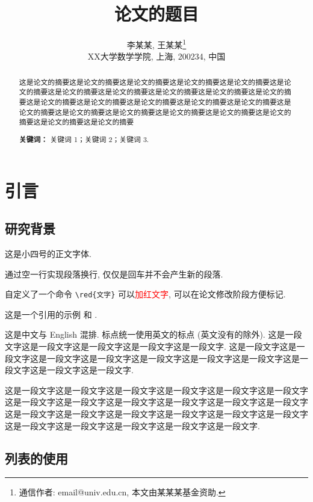 \documentclass[zihao=-4,twoside,final]{ctexart}
\title{论文的题目}
\author{李某某, 王某某\thanks{通信作者: email@univ.edu.cn, 本文由某某某基金资助.} \\[6pt]
  XX大学数学学院, 上海, 200234, 中国}
\date{}
\numberwithin{equation}{section}
\numberwithin{figure}{section}
\numberwithin{table}{section}
\theoremstyle{plain}
\newcommand{\red}[1]{\textcolor{red}{#1}}
\begin{document}
\maketitle

\begin{abstract}
这是论文的摘要这是论文的摘要这是论文的摘要这是论文的摘要这是论文的摘要这是论文的摘要这是论文的摘要这是论文的摘要这是论文的摘要这是论文的摘要这是论文的摘要这是论文的摘要这是论文的摘要这是论文的摘要这是论文的摘要这是论文的摘要这是论文的摘要这是论文的摘要这是论文的摘要这是论文的摘要这是论文的摘要这是论文的摘要这是论文的摘要这是论文的摘要

\medskip
\noindent\textbf{关键词：} 关键词 1；关键词 2；关键词 3.
\end{abstract}





\section{引言}

\subsection{研究背景}

这是小四号的正文字体.

通过空一行实现段落换行, 仅仅是回车并不会产生新的段落.

自定义了一个命令 \verb|\red{文字}| 可以\red{加红文字}, 可以在论文修改阶段方便标记.

这是一个引用的示例 \cite{Adams2003}和 \cite{Shen1994,Tadmor2012,TreWei2014}.

这是中文与 English 混排. 标点统一使用英文的标点 (英文没有的除外). 这是一段文字这是一段文字这是一段文字这是一段文字这是一段文字. 这是一段文字这是一段文字这是一段文字这是一段文字这是一段文字这是一段文字这是一段文字这是一段文字这是一段文字这是一段文字.

这是一段文字这是一段文字这是一段文字这是一段文字这是一段文字这是一段文字这是一段文字这是一段文字这是一段文字这是一段文字这是一段文字这是一段文字这是一段文字这是一段文字这是一段文字这是一段文字这是一段文字这是一段文字这是一段文字这是一段文字这是一段文字这是一段文字这是一段文字.

\subsection{列表的使用}
\end{document}
